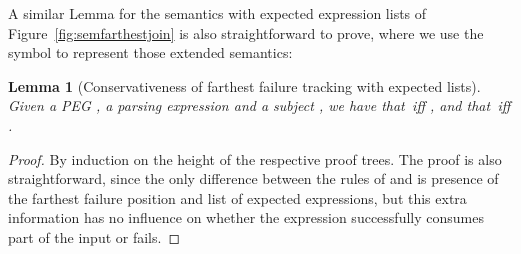 \documentclass[3p,12pt,singlecolumn]{elsarticle}
\newtheorem{lemma}[proposition]{Lemma}
\begin{document}
A similar Lemma for the semantics with expected expression lists
of Figure~\ref{fig:semfarthestjoin} is also straightforward to
prove, where we use the symbol  to represent those extended
semantics:
\begin{lemma}[Conservativeness of farthest failure tracking with expected lists]
	Given a PEG , a parsing expression  and a subject , we have that 
	 \,iff\; ,
	and that 
	 \,iff\; .
\end{lemma}
\begin{proof}
By induction on the height of the respective proof trees. 
The proof is also straightforward, since the only difference
between the rules of  and  is presence of
the farthest failure position and list of expected expressions, 
but this extra information has
no influence on whether the expression successfully
consumes part of the input or fails.
\end{proof}
\clearpage{}	
\end{document}
